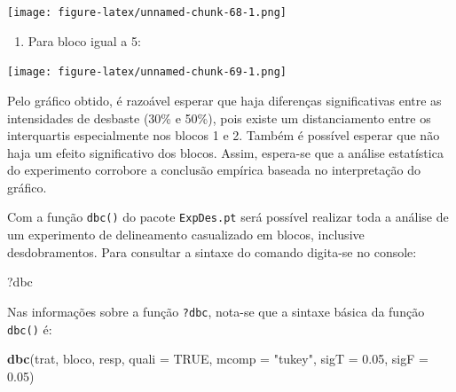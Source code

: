 \documentclass[
]{article}
\newenvironment{Shaded}{\begin{snugshade}}{\end{snugshade}}
\newcommand{\DataTypeTok}[1]{\textcolor[rgb]{0.13,0.29,0.53}{#1}}
\newcommand{\DecValTok}[1]{\textcolor[rgb]{0.00,0.00,0.81}{#1}}
\newcommand{\FloatTok}[1]{\textcolor[rgb]{0.00,0.00,0.81}{#1}}
\newcommand{\KeywordTok}[1]{\textcolor[rgb]{0.13,0.29,0.53}{\textbf{#1}}}
\newcommand{\NormalTok}[1]{#1}
\newcommand{\OperatorTok}[1]{\textcolor[rgb]{0.81,0.36,0.00}{\textbf{#1}}}
\newcommand{\OtherTok}[1]{\textcolor[rgb]{0.56,0.35,0.01}{#1}}
\newcommand{\StringTok}[1]{\textcolor[rgb]{0.31,0.60,0.02}{#1}}
\providecommand{\tightlist}{%
  \setlength{\itemsep}{0pt}\setlength{\parskip}{0pt}}
\begin{document}
\texttt{[image: figure-latex/unnamed-chunk-68-1.png]}

\begin{enumerate}
\def\labelenumi{\arabic{enumi}.}
\setcounter{enumi}{4}
\tightlist
\item
  Para bloco igual a 5:
\end{enumerate}

\begin{Shaded}
\end{Shaded}

\texttt{[image: figure-latex/unnamed-chunk-69-1.png]}

Pelo gráfico obtido, é razoável esperar que haja diferenças significativas entre as intensidades de desbaste (30\% e 50\%), pois existe um distanciamento entre os interquartis especialmente nos blocos 1 e 2. Também é possível esperar que não haja um efeito significativo dos blocos. Assim, espera-se que a análise estatística do experimento corrobore a conclusão empírica baseada no interpretação do gráfico.

Com a função \texttt{dbc()} do pacote \texttt{ExpDes.pt} será possível realizar toda a análise de um experimento de delineamento casualizado em blocos, inclusive desdobramentos. Para consultar a sintaxe do comando digita-se no console:

\begin{Shaded}
\begin{Highlighting}[]
\NormalTok{?dbc}
\end{Highlighting}
\end{Shaded}

Nas informações sobre a função \texttt{?dbc}, nota-se que a sintaxe básica da função \texttt{dbc()} é:

\begin{Shaded}
\begin{Highlighting}[]
\KeywordTok{dbc}\NormalTok{(trat, bloco, resp, }\DataTypeTok{quali =} \OtherTok{TRUE}\NormalTok{, }\DataTypeTok{mcomp =} \StringTok{"tukey"}\NormalTok{, }
    \DataTypeTok{sigT =} \FloatTok{0.05}\NormalTok{, }\DataTypeTok{sigF =} \FloatTok{0.05}\NormalTok{)}
\end{Highlighting}
\end{Shaded}
\end{document}
